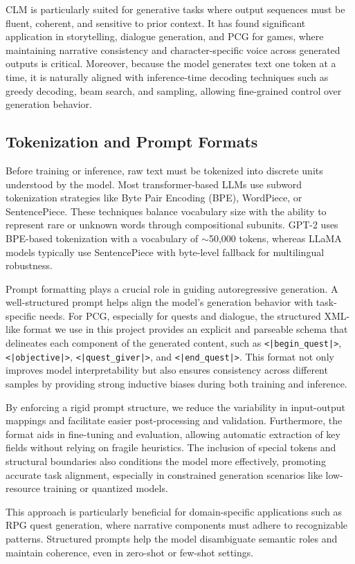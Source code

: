 CLM is particularly suited for generative tasks where output sequences must be fluent,
coherent, and sensitive to prior context. It has found significant application in storytelling,
dialogue generation, and PCG for games, where maintaining narrative consistency and
character-specific voice across generated outputs is critical. Moreover, because the model
generates text one token at a time, it is naturally aligned with inference-time decoding
techniques such as greedy decoding, beam search, and sampling, allowing fine-grained
control over generation behavior.

\subsection{Tokenization and Prompt Formats}

Before training or inference, raw text must be tokenized into discrete units understood
by the model. Most transformer-based LLMs use subword tokenization strategies like
Byte Pair Encoding (BPE), WordPiece, or SentencePiece. These techniques balance vocabulary
size with the ability to represent rare or unknown words through compositional
subunits. GPT-2 uses BPE-based tokenization with a vocabulary of $\sim$50,000 tokens,
whereas LLaMA models typically use SentencePiece with byte-level fallback for multilingual
robustness.

Prompt formatting plays a crucial role in guiding autoregressive generation. A well-structured
prompt helps align the model's generation behavior with task-specific needs.
For PCG, especially for quests and dialogue, the structured XML-like format we use in
this project provides an explicit and parseable schema that delineates each component of
the generated content, such as \texttt{<|begin\_quest|>}, \texttt{<|objective|>}, \texttt{<|quest\_giver|>}, and
\texttt{<|end\_quest|>}. This format not only improves model interpretability but also ensures
consistency across different samples by providing strong inductive biases during both
training and inference.

By enforcing a rigid prompt structure, we reduce the variability in input-output mappings
and facilitate easier post-processing and validation. Furthermore, the format aids
in fine-tuning and evaluation, allowing automatic extraction of key fields without relying
on fragile heuristics. The inclusion of special tokens and structural boundaries also
conditions the model more effectively, promoting accurate task alignment, especially in
constrained generation scenarios like low-resource training or quantized models.

This approach is particularly beneficial for domain-specific applications such as RPG
quest generation, where narrative components must adhere to recognizable patterns.
Structured prompts help the model disambiguate semantic roles and maintain coherence,
even in zero-shot or few-shot settings.

\newpage
